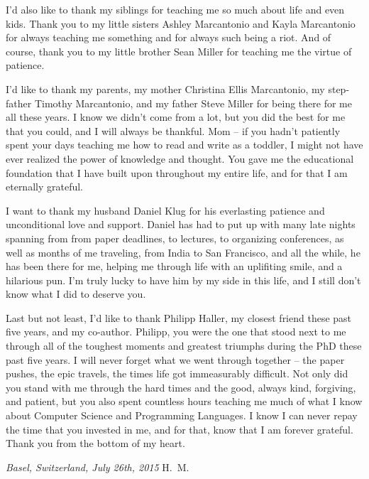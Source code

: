 \vspace{0.5cm} I'd also like to thank my siblings for teaching me so much about
life and even kids. Thank you to my little sisters Ashley Marcantonio and Kayla
Marcantonio for always teaching me something and for always such being a riot.
And of course, thank you to my little brother Sean Miller for teaching me the
virtue of patience.

\vspace{0.5cm} I'd like to thank my parents, my mother Christina Ellis
Marcantonio, my step-father Timothy Marcantonio, and my father Steve Miller for
being there for me all these years. I know we didn't come from a lot, but you
did the best for me that you could, and I will always be thankful. Mom -- if you
hadn't patiently spent your days teaching me how to read and write as a toddler,
I might not have ever realized the power of knowledge and thought. You gave me
the educational foundation that I have built upon throughout my entire life, and
for that I am eternally grateful.

\vspace{0.5cm}
I want to thank my husband Daniel Klug for his everlasting patience and
unconditional love and support. Daniel has had to put up with many late nights
spanning from from paper deadlines, to lectures, to organizing conferences, as
well as months of me traveling, from India to San Francisco, and all the while,
he has been there for me, helping me through life with an uplifiting smile, and
a hilarious pun. I'm truly lucky to have him by my side in this life, and I
still don't know what I did to deserve you.

\vspace{0.5cm}
Last but not least, I'd like to thank Philipp Haller, my closest friend these
past five years, and my co-author. Philipp, you were the one that stood next to
me through all of the toughest moments and greatest triumphs during the PhD
these past five years. I will never forget what we went through together -- the
paper pushes, the epic travels, the times life got immeasurably difficult. Not
only did you stand with me through the hard times and the good, always kind,
forgiving, and patient, but you also spent countless hours teaching me much of
what I know about Computer Science and Programming Languages. I know I can never
repay the time that you invested in me, and for that, know that I am forever
grateful. Thank you from the bottom of my heart.

\bigskip

\noindent\textit{Basel, Switzerland, July 26th, 2015}
\hfill H.~M.
